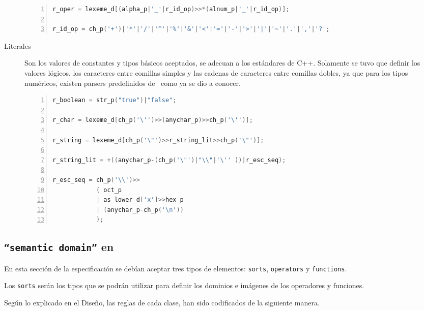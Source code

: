 \begin{description}
\begin{lstlisting}[language=C++, basicstyle=\scriptsize, numbers=left, numbersep=5pt, numberstyle=\tiny]
r_oper = lexeme_d[(alpha_p|'_'|r_id_op)>>*(alnum_p|'_'|r_id_op)];

r_id_op = ch_p('+')|'*'|'/'|'^'|'%'|'&'|'<'|'='|'-'|'>'|'|'|'~'|'.'|','|'?';
\end{lstlisting}

\item [Literales] Son los valores de constantes y tipos básicos aceptados, se adecuan a los estándares de C++. Solamente se tuvo que definir los valores lógicos, los caracteres entre comillas simples y las cadenas de caracteres entre comillas dobles, ya que para los tipos numéricos, existen parsers predefinidos de \spirit\ como ya se dio a conocer.

\begin{lstlisting}[language=C++, basicstyle=\scriptsize, numbers=left, numbersep=5pt, numberstyle=\tiny]
r_boolean = str_p("true")|"false";

r_char = lexeme_d[ch_p('\'')>>(anychar_p)>>ch_p('\'')];

r_string = lexeme_d[ch_p('\"')>>r_string_lit>>ch_p('\"')];

r_string_lit = +((anychar_p-(ch_p('\"')|"\\"|'\'' ))|r_esc_seq);

r_esc_seq = ch_p('\\')>>
            ( oct_p
            | as_lower_d['x']>>hex_p
            | (anychar_p-ch_p('\n'))
            );               
\end{lstlisting}
\end{description}

\subsection{\texttt{``semantic domain''} en \spirit}

En esta sección de la especificación se debían aceptar tres tipos de elementos: \texttt{sorts}, \texttt{operators} y \texttt{functions}.

Los \texttt{sorts} serán los tipos que se podrán utilizar para definir los dominios e imágenes de los operadores y funciones.

Según lo explicado en el Diseño, las reglas de cada clase, han sido codificados de la siguiente manera.

